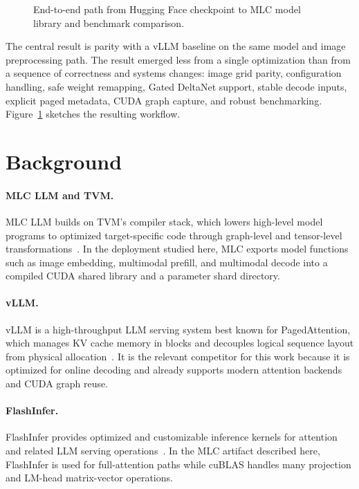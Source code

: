 \documentclass[10pt]{article}
\begin{document}
\begin{figure}[t]
  \centering
  
  \caption{End-to-end path from Hugging Face checkpoint to MLC model library and
  benchmark comparison.}
  \label{fig:pipeline}
\end{figure}

The central result is parity with a vLLM baseline on the same model and image
preprocessing path. The result emerged less from a single optimization than
from a sequence of correctness and systems changes: image grid parity,
configuration handling, safe weight remapping, Gated DeltaNet support, stable
decode inputs, explicit paged metadata, CUDA graph capture, and robust
benchmarking. Figure~\ref{fig:pipeline} sketches the resulting workflow.

\section{Background}

\paragraph{MLC LLM and TVM.}
MLC LLM builds on TVM's compiler stack, which lowers high-level model programs
to optimized target-specific code through graph-level and tensor-level
transformations~\cite{chen2018tvm}. In the deployment studied here, MLC exports
model functions such as image embedding, multimodal prefill, and multimodal
decode into a compiled CUDA shared library and a parameter shard directory.

\paragraph{vLLM.}
vLLM is a high-throughput LLM serving system best known for PagedAttention,
which manages KV cache memory in blocks and decouples logical sequence layout
from physical allocation~\cite{kwon2023pagedattention}. It is the relevant
competitor for this work because it is optimized for online decoding and
already supports modern attention backends and CUDA graph reuse.

\paragraph{FlashInfer.}
FlashInfer provides optimized and customizable inference kernels for attention
and related LLM serving operations~\cite{flashinfer2025}. In the MLC artifact
described here, FlashInfer is used for full-attention paths while cuBLAS handles
many projection and LM-head matrix-vector operations.
\end{document}

